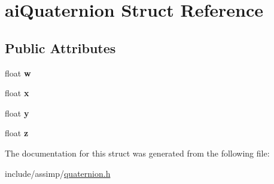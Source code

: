 \hypertarget{structaiQuaternion}{\section{ai\-Quaternion \-Struct \-Reference}
\label{structaiQuaternion}
}
\subsection*{\-Public \-Attributes}
\begin{DoxyCompactItemize}
\item 
\hypertarget{structaiQuaternion_a410b3c46417d67d728a01a5810907a36}{float {\bfseries w}}\label{structaiQuaternion_a410b3c46417d67d728a01a5810907a36}

\item 
\hypertarget{structaiQuaternion_af9db21b086c14d8654d62005f740e75f}{float {\bfseries x}}\label{structaiQuaternion_af9db21b086c14d8654d62005f740e75f}

\item 
\hypertarget{structaiQuaternion_a1695fefbc60becf95fcafcc08573ab44}{float {\bfseries y}}\label{structaiQuaternion_a1695fefbc60becf95fcafcc08573ab44}

\item 
\hypertarget{structaiQuaternion_acc30da6103d5131fb1bed6640f1eeda0}{float {\bfseries z}}\label{structaiQuaternion_acc30da6103d5131fb1bed6640f1eeda0}

\end{DoxyCompactItemize}


\-The documentation for this struct was generated from the following file\-:\begin{DoxyCompactItemize}
\item 
include/assimp/\hyperlink{quaternion_8h}{quaternion.\-h}\end{DoxyCompactItemize}
